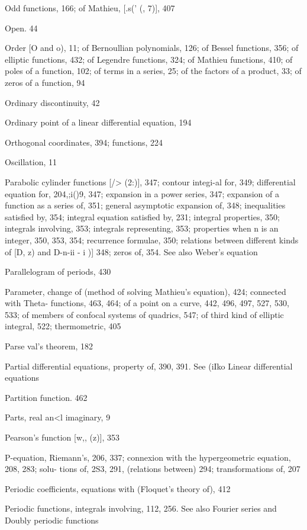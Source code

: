 Odd functions, 166; of Mathieu, [.s(' (, 7)], 407

Open. 44

Order [O and o), 11; of Bernoullian polynomials, 126; of Bessel functions, 356; of elliptic
functions, 432; of Legendre functions, 324; of Mathieu functions, 410; of poles of a
function, 102; of terms in a series, 25; of the factors of a product, 33; of zeros of a
function, 94

Ordinary discontinuity, 42

Ordinary point of a linear differential equation, 194

Orthogonal coordinates, 394; functions, 224

Oscillation, 11

Parabolic cylinder functions [/>  (2:)], 347; contour integi-al for, 349; differential equation for,
204,;i()9, 347; expansion in a power series, 347; expansion of a function as a series of, 351;
general asymptotic expansion of, 348; inequalities satisfied by, 354; integral equation
satisfied by, 231; integral properties, 350; integrals involving, 353; integrals representing,
353; properties when n is an integer, 350, 353, 354; recurrence formulae, 350; relations
between different kinds of [D,  z) and D-n-ii - i )]  348; zeros of, 354. See also Weber's
equation

Parallelogram of periods, 430

Parameter, change of (method of solving Mathieu's equation), 424; connected with Theta-
functions, 463, 464; of a point on a curve, 442, 496, 497, 527, 530, 533; of members of
confocal systems of quadrics, 547; of third kind of elliptic integral, 522; thermometric, 405

Parse val's theorem, 182

Partial differential equations, property of, 390, 391. See (iIko Linear differential equations

Partition function. 462

Parts, real an<l imaginary, 9

Pearson's function [w,, (z)], 353

P-equation, Riemann's, 206, 337; connexion with the hypergeometric equation, 208, 283; solu-
tions of, 2S3, 291, (relations between) 294; transformations of, 207

Periodic coefficients, equations with (Floquet's theory of), 412

Periodic functions, integrals involving, 112, 256. See also Fourier series and Doubly periodic
functions

